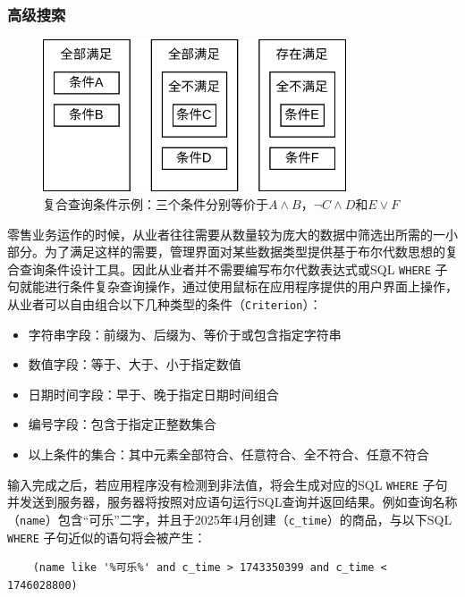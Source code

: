 \subsubsection{高级搜索}

\begin{figure}[htbp]
	\centering
	\includegraphics[width=0.8\textwidth]{./imgs/rma-design-adse.png}
	\caption{复合查询条件示例：三个条件分别等价于$ A \land B $，$ \neg C \land D $和$ E \lor F $}
	\label{fig:rma-design-adse}
\end{figure}

零售业务运作的时候，从业者往往需要从数量较为庞大的数据中筛选出所需的一小部分。为了满足这样的需要，管理界面对某些数据类型提供基于布尔代数思想的复合查询条件设计工具。因此从业者并不需要编写布尔代数表达式或SQL \verb|WHERE| 子句就能进行条件复杂查询操作，通过使用鼠标在应用程序提供的用户界面上操作，从业者可以自由组合以下几种类型的条件（\verb|Criterion|）：

\begin{itemize}
	\item 字符串字段：前缀为、后缀为、等价于或包含指定字符串
	\item 数值字段：等于、大于、小于指定数值
	\item 日期时间字段：早于、晚于指定日期时间组合
	\item 编号字段：包含于指定正整数集合
	\item 以上条件的集合：其中元素全部符合、任意符合、全不符合、任意不符合
\end{itemize}

输入完成之后，若应用程序没有检测到非法值，将会生成对应的SQL \verb|WHERE| 子句并发送到服务器，服务器将按照对应语句运行SQL查询并返回结果。例如查询名称（\verb|name|）包含“可乐”二字，并且于2025年4月创建（\verb|c_time|）的商品，与以下SQL \verb|WHERE| 子句近似的语句将会被产生：

\begin{verbatim}
	(name like '%可乐%' and c_time > 1743350399 and c_time < 1746028800)
\end{verbatim}

